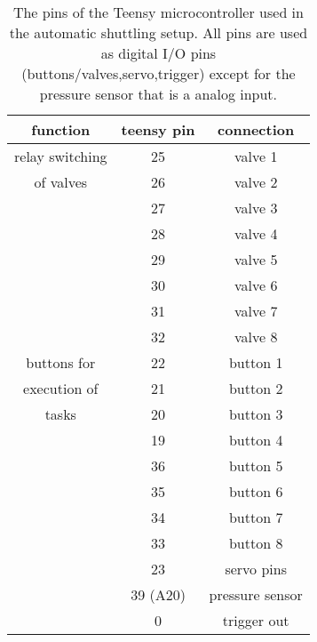             \begin{table}
                \centering
                \begin{tabular}{|c|c|c|}
                    \hline
                    function & teensy pin & connection\\
                    \hline
                    relay switching & 25 & valve 1\\
                    of valves       & 26 & valve 2\\
                                    & 27 & valve 3\\
                                    & 28 & valve 4\\
                                    & 29 & valve 5\\
                                    & 30 & valve 6\\
                                    & 31 & valve 7\\
                                    & 32 & valve 8\\
                    \hline
                    buttons for     & 22 &button 1 \\
                    execution of                & 21 &button 2 \\
                    tasks                & 20 &button 3 \\
                                    & 19 &button 4 \\
                                    & 36 &button 5 \\
                                    & 35 &button 6 \\
                                    & 34 &button 7 \\
                                    & 33 &button 8 \\
                    \hline
                                    & 23 & servo pins \\
                    \hline
                    & 39 (A20) & pressure sensor\\
                    \hline
                                    & 0 & trigger out\\
                    \hline
                \end{tabular}
                \caption[Shuttling system pin layout]{The pins of the Teensy microcontroller used in the automatic shuttling setup. All pins are used as digital I/O pins (buttons/valves,servo,trigger) except for the pressure sensor that is a analog input.}
                \label{table:matMeth:connectionsRelaisBox}
            \end{table}
